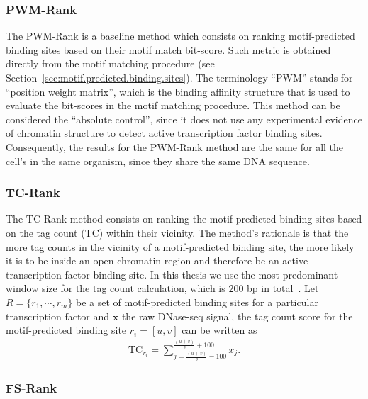 \subsubsection{PWM-Rank}
\label{sec:pwm.rank}

The PWM-Rank is a baseline method which consists on ranking motif-predicted binding sites based on their motif match bit-score. Such metric is obtained directly from the motif matching procedure (see Section~\ref{sec:motif.predicted.binding.sites}). The terminology ``PWM'' stands for ``position weight matrix'', which is the binding affinity structure that is used to evaluate the bit-scores in the motif matching procedure. This method can be considered the ``absolute control'', since it does not use any experimental evidence of chromatin structure to detect active transcription factor binding sites. Consequently, the results for the PWM-Rank method are the same for all the cell's in the same organism, since they share the same DNA sequence.

\subsubsection{TC-Rank}
\label{sec:tc.rank}

The TC-Rank method consists on ranking the motif-predicted binding sites based on the tag count (TC) within their vicinity. The method's rationale is that the more tag counts in the vicinity of a motif-predicted binding site, the more likely it is to be inside an open-chromatin region and therefore be an active transcription factor binding site. In this thesis we use the most predominant window size for the tag count calculation, which is $200$ bp in total~\cite{cuellar2012,he2014}. Let $R = \{ {r}_{1}, \cdots, {r}_{m} \}$ be a set of motif-predicted binding sites for a particular transcription factor and $\mathbf{x}$ the raw DNase-seq signal, the tag count score for the motif-predicted binding site ${r}_{i} = [u,v]$ can be written as
\begin{align}
\text{TC}_{{r}_{i}} = \sum_{j=\frac{(u+v)}{2} - 100}^{\frac{(u+v)}{2} + 100} {x}_{j}.
\label{eq:tc}
\end{align}

\subsubsection{FS-Rank}
\label{sec:fs.rank}

